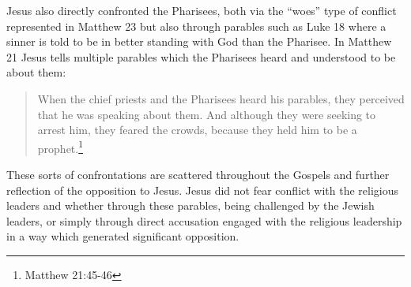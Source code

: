 \documentclass[12pt]{turabian-researchpaper}
\begin{document}
Jesus also directly confronted the Pharisees, both via the ``woes'' type of conflict represented in Matthew 23 but also through parables such as Luke 18 where a sinner is told to be in better standing with God than the Pharisee. In Matthew 21 Jesus tells multiple parables which the Pharisees heard and understood to be about them:

\begin{quotation}
When the chief priests and the Pharisees heard his parables, they perceived that he was speaking about them.  And although they were seeking to arrest him, they feared the crowds, because they held him to be a prophet.\footnote{Matthew 21:45-46}
\end{quotation}
\newpage

These sorts of confrontations are scattered throughout the Gospels and further reflection of the opposition to Jesus. Jesus did not fear conflict with the religious leaders and whether through these parables, being challenged by the Jewish leaders, or simply through direct accusation engaged with the religious leadership in a way which generated significant opposition.


\printbibliography
\end{document}

